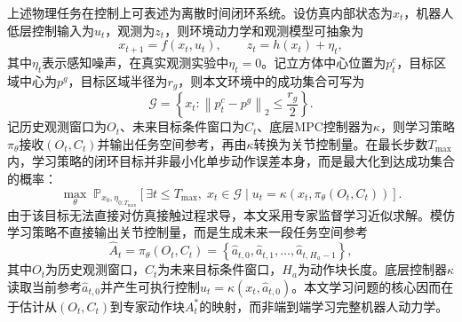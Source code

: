 上述物理任务在控制上可表述为离散时间闭环系统。设仿真内部状态为$x_t$，机器人低层控制输入为$u_t$，观测为$z_t$，则环境动力学和观测模型可抽象为
\begin{equation}
    x_{t+1}=f(x_t,u_t),\qquad z_t=h(x_t)+\eta_t,
    \label{eq:closed-loop-dynamics}
\end{equation}
其中$\eta_t$表示感知噪声，在真实观测实验中$\eta_t=0$。记立方体中心位置为$p^c_t$，目标区域中心为$p^g$，目标区域半径为$r_g$，则本文环境中的成功集合可写为
\begin{equation}
    \mathcal{G}=\left\{x_t:\left\|p^c_t-p^g\right\|_2\leq \frac{r_g}{2}\right\}.
    \label{eq:success-set}
\end{equation}
记历史观测窗口为$O_t$、未来目标条件窗口为$C_t$、底层MPC控制器为$\kappa$，则学习策略$\pi_\theta$接收$(O_t,C_t)$并输出任务空间参考，再由$\kappa$转换为关节控制量。在最长步数$T_{\max}$内，学习策略的闭环目标并非最小化单步动作误差本身，而是最大化到达成功集合的概率：
\begin{equation}
    \max_\theta\; \mathbb{P}_{x_0,\eta_{0:T_{\max}}}
    \left[\exists t\leq T_{\max},\;x_t\in\mathcal{G}\mid u_t=\kappa(x_t,\pi_\theta(O_t,C_t))\right].
    \label{eq:closed-loop-objective}
\end{equation}
由于该目标无法直接对仿真接触过程求导，本文采用专家监督学习近似求解。模仿学习策略不直接输出关节控制量，而是生成未来一段任务空间参考
\begin{equation}
    \hat{A}_t = \pi_\theta(O_t,C_t)
    =\left\{\hat{a}_{t,0},\hat{a}_{t,1},\ldots,\hat{a}_{t,H_a-1}\right\},
    \label{eq:policy-map}
\end{equation}
其中$O_t$为历史观测窗口，$C_t$为未来目标条件窗口，$H_a$为动作块长度。底层控制器$\kappa$读取当前参考$\hat{a}_{t,0}$并产生可执行控制$u_t=\kappa(x_t,\hat{a}_{t,0})$。本文学习问题的核心因而在于估计从$(O_t,C_t)$到专家动作块$A_t^*$的映射，而非端到端学习完整机器人动力学。

